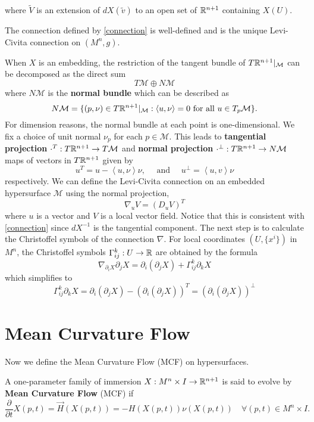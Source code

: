 where $ \tilde{V} $ is an extension of $ dX(\tilde{v}) $ to an open set of $ \mathbb{R}^{n+1} $ containing $ X(U) $.  
\begin{lemma}
    The connection defined by \cref{connection} is well-defined and is the unique Levi-Civita connection on $ (M^{n},g) $.
\end{lemma}
When $ X $ is an embedding, the restriction of the tangent bundle of $ T\mathbb{R}^{n+1}|_{\mathcal{M}} $ can be decomposed as the direct sum 
\[ T\mathcal{M}\oplus N\mathcal{M}  \]
where $ N\mathcal{M} $ is the \textbf{normal bundle}  which can be described as 
\[ N\mathcal{M} = \{(p,\nu) \in T\mathbb{R}^{n+1}|_{ \mathcal{M}} : \left< u, \nu \right> =0 \text{ for all } u \in T_{p} \mathcal{M}\}. \]
For dimension reasons, the normal bundle at each point is one-dimensional. We fix a choice of unit normal $ \nu_{p} $ for each $ p \in \mathcal{M} $. This leads to \textbf{tangential projection} $ \cdot^{T} : T\mathbb{R}^{n+1} \to T \mathcal{M}$  and \textbf{normal projection} $ \cdot^{\perp} : T\mathbb{R}^{n+1} \to N \mathcal{M} $ maps of vectors in $ T\mathbb{R}^{n+1} $ given by 
\[ u^{T} = u-\left< u,\nu \right> \nu,\quad \text{ and }\quad u^{\perp} = \left< u,v \right>\nu\]
respectively. We can define the Levi-Civita connection on an embedded hypersurface $ \mathcal{M} $ using the normal projection, 
\[ \nabla_{u}V  = (D_{u}V)^{T}\]
where $ u  $ is a vector and $ V $ is a local vector field. Notice that this is consistent with \cref{connection} since $ dX^{-1} $ is the tangential component. The next step is to calculate the Christoffel symbols of the connection $ \nabla $. For local coordinates $ (U, \{x^{i}\}) $ in $ M^{n} $, the Christoffel symbols $ \Gamma_{ij}^{k}: U \to \mathbb{R} $ are obtained by the formula
\[ \nabla_{ \partial_{i}X} \partial_{j}X = \partial_{i} (\partial_{j}X) + \Gamma_{ij}^{k} \partial_{k}X \]
which simplifies to 
\[ \Gamma_{ij}^{k} \partial_{k}X = \partial_{i}( \partial_{j}X) - (\partial_{i}( \partial_{j}X))^{T} = (\partial_{i}( \partial_{j}X))^{\perp}\]



\section{Mean Curvature Flow}

Now we define the Mean Curvature Flow (MCF) on hypersurfaces. 
\begin{defn}
    A one-parameter family of immersion $ X: M^{n} \times I \to \mathbb{R}^{n+1} $ is said to evolve by \textbf{Mean Curvature Flow} (MCF) if 
		\begin{equation}
            \frac{ \partial}{ \partial t}X(p,t) = \vec{H}(X(p,t))  = -H(X(p,t))\nu(X(p,t)) \quad \forall (p,t) \in M^{n} \times I.
        \end{equation}
\end{defn}

